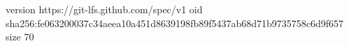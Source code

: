 version https://git-lfs.github.com/spec/v1
oid sha256:fe063200037c34aeea10a451d8639198fb89f5437ab68d71b9735758c6d9f657
size 70
